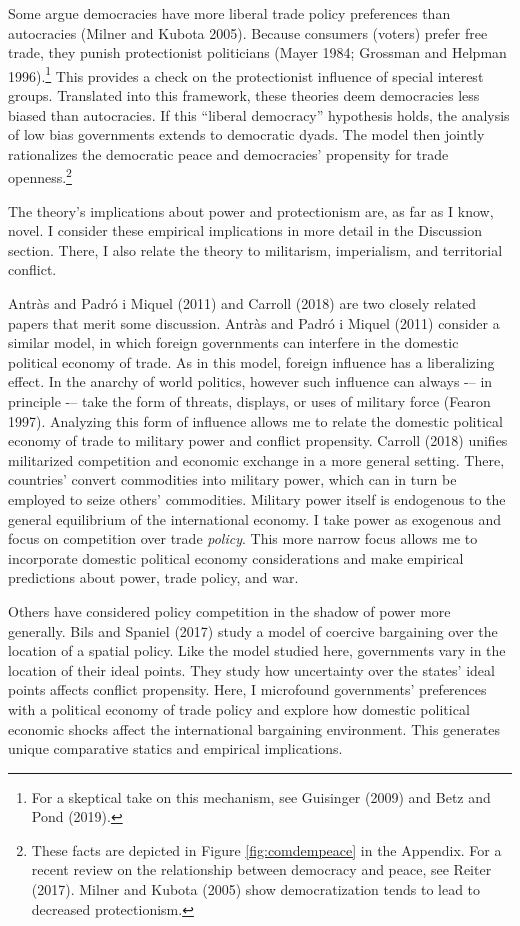 \documentclass{puthesis}
\begin{document}
Some argue democracies have more liberal trade policy preferences than
autocracies (Milner and Kubota 2005). Because consumers (voters) prefer
free trade, they punish protectionist politicians (Mayer 1984; Grossman
and Helpman 1996).\footnote{For a skeptical take on this mechanism, see
  Guisinger (2009) and Betz and Pond (2019).} This provides a check on
the protectionist influence of special interest groups. Translated into
this framework, these theories deem democracies less biased than
autocracies. If this ``liberal democracy'' hypothesis holds, the
analysis of low bias governments extends to democratic dyads. The model
then jointly rationalizes the democratic peace and democracies'
propensity for trade openness.\footnote{These facts are depicted in
  Figure \ref{fig:comdempeace} in the Appendix. For a recent review on
  the relationship between democracy and peace, see Reiter (2017).
  Milner and Kubota (2005) show democratization tends to lead to
  decreased protectionism.}

The theory's implications about power and protectionism are, as far as I
know, novel. I consider these empirical implications in more detail in
the Discussion section. There, I also relate the theory to militarism,
imperialism, and territorial conflict.

Antràs and Padró i Miquel (2011) and Carroll (2018) are two closely
related papers that merit some discussion. Antràs and Padró i Miquel
(2011) consider a similar model, in which foreign governments can
interfere in the domestic political economy of trade. As in this model,
foreign influence has a liberalizing effect. In the anarchy of world
politics, however such influence can always -\/-- in principle -\/--
take the form of threats, displays, or uses of military force (Fearon
1997). Analyzing this form of influence allows me to relate the domestic
political economy of trade to military power and conflict propensity.
Carroll (2018) unifies militarized competition and economic exchange in
a more general setting. There, countries' convert commodities into
military power, which can in turn be employed to seize others'
commodities. Military power itself is endogenous to the general
equilibrium of the international economy. I take power as exogenous and
focus on competition over trade \emph{policy}. This more narrow focus
allows me to incorporate domestic political economy considerations and
make empirical predictions about power, trade policy, and war.

Others have considered policy competition in the shadow of power more
generally. Bils and Spaniel (2017) study a model of coercive bargaining
over the location of a spatial policy. Like the model studied here,
governments vary in the location of their ideal points. They study how
uncertainty over the states' ideal points affects conflict propensity.
Here, I microfound governments' preferences with a political economy of
trade policy and explore how domestic political economic shocks affect
the international bargaining environment. This generates unique
comparative statics and empirical implications.
\end{document}
